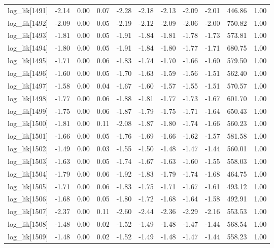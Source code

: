 \begin{table}[ht]
\begin{tabular}{rrrrrrrrrrr}
  log\_lik[1491] & -2.14 & 0.00 & 0.07 & -2.28 & -2.18 & -2.13 & -2.09 & -2.01 & 446.86 & 1.00 \\ 
  log\_lik[1492] & -2.09 & 0.00 & 0.05 & -2.19 & -2.12 & -2.09 & -2.06 & -2.00 & 750.82 & 1.00 \\ 
  log\_lik[1493] & -1.81 & 0.00 & 0.05 & -1.91 & -1.84 & -1.81 & -1.78 & -1.73 & 573.81 & 1.00 \\ 
  log\_lik[1494] & -1.80 & 0.00 & 0.05 & -1.91 & -1.84 & -1.80 & -1.77 & -1.71 & 680.75 & 1.00 \\ 
  log\_lik[1495] & -1.71 & 0.00 & 0.06 & -1.83 & -1.74 & -1.70 & -1.66 & -1.60 & 579.50 & 1.00 \\ 
  log\_lik[1496] & -1.60 & 0.00 & 0.05 & -1.70 & -1.63 & -1.59 & -1.56 & -1.51 & 562.40 & 1.00 \\ 
  log\_lik[1497] & -1.58 & 0.00 & 0.04 & -1.67 & -1.60 & -1.57 & -1.55 & -1.51 & 570.57 & 1.00 \\ 
  log\_lik[1498] & -1.77 & 0.00 & 0.06 & -1.88 & -1.81 & -1.77 & -1.73 & -1.67 & 601.70 & 1.00 \\ 
  log\_lik[1499] & -1.75 & 0.00 & 0.06 & -1.87 & -1.79 & -1.75 & -1.71 & -1.64 & 650.43 & 1.00 \\ 
  log\_lik[1500] & -1.81 & 0.00 & 0.11 & -2.08 & -1.87 & -1.80 & -1.74 & -1.66 & 560.23 & 1.00 \\ 
  log\_lik[1501] & -1.66 & 0.00 & 0.05 & -1.76 & -1.69 & -1.66 & -1.62 & -1.57 & 581.58 & 1.00 \\ 
  log\_lik[1502] & -1.49 & 0.00 & 0.03 & -1.55 & -1.50 & -1.48 & -1.47 & -1.44 & 560.01 & 1.00 \\ 
  log\_lik[1503] & -1.63 & 0.00 & 0.05 & -1.74 & -1.67 & -1.63 & -1.60 & -1.55 & 558.03 & 1.00 \\ 
  log\_lik[1504] & -1.79 & 0.00 & 0.06 & -1.92 & -1.83 & -1.79 & -1.74 & -1.68 & 464.75 & 1.00 \\ 
  log\_lik[1505] & -1.71 & 0.00 & 0.06 & -1.83 & -1.75 & -1.71 & -1.67 & -1.61 & 493.12 & 1.00 \\ 
  log\_lik[1506] & -1.68 & 0.00 & 0.05 & -1.80 & -1.72 & -1.68 & -1.64 & -1.58 & 492.91 & 1.00 \\ 
  log\_lik[1507] & -2.37 & 0.00 & 0.11 & -2.60 & -2.44 & -2.36 & -2.29 & -2.16 & 553.53 & 1.00 \\ 
  log\_lik[1508] & -1.48 & 0.00 & 0.02 & -1.52 & -1.49 & -1.48 & -1.47 & -1.44 & 568.54 & 1.00 \\ 
  log\_lik[1509] & -1.48 & 0.00 & 0.02 & -1.52 & -1.49 & -1.48 & -1.47 & -1.44 & 558.23 & 1.00 \\ 

\end{tabular}
\end{table}
